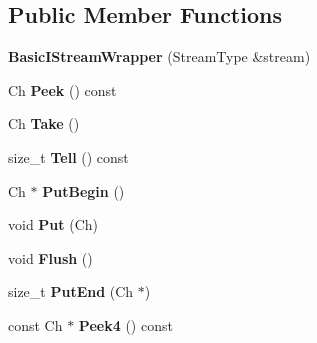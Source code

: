 \subsection*{Public Member Functions}
\begin{DoxyCompactItemize}
\item 
{\bfseries Basic\+I\+Stream\+Wrapper} (Stream\+Type \&stream)\hypertarget{class_basic_i_stream_wrapper_a3e9a2dd2b6b28243f8f2a911f67cdf56}{}\label{class_basic_i_stream_wrapper_a3e9a2dd2b6b28243f8f2a911f67cdf56}

\item 
Ch {\bfseries Peek} () const \hypertarget{class_basic_i_stream_wrapper_ae0c3f22e0955034c3dc90c2398ff4742}{}\label{class_basic_i_stream_wrapper_ae0c3f22e0955034c3dc90c2398ff4742}

\item 
Ch {\bfseries Take} ()\hypertarget{class_basic_i_stream_wrapper_afb71f0329d0abbbc9b22ebeb5c1464d1}{}\label{class_basic_i_stream_wrapper_afb71f0329d0abbbc9b22ebeb5c1464d1}

\item 
size\+\_\+t {\bfseries Tell} () const \hypertarget{class_basic_i_stream_wrapper_a7da87efb1177bfaa131f33c0cb2873fc}{}\label{class_basic_i_stream_wrapper_a7da87efb1177bfaa131f33c0cb2873fc}

\item 
Ch $\ast$ {\bfseries Put\+Begin} ()\hypertarget{class_basic_i_stream_wrapper_a62a3fc10b009ea231fb9d2dc958c539c}{}\label{class_basic_i_stream_wrapper_a62a3fc10b009ea231fb9d2dc958c539c}

\item 
void {\bfseries Put} (Ch)\hypertarget{class_basic_i_stream_wrapper_afa71cb2f5b7668837d0a81e3bce55e69}{}\label{class_basic_i_stream_wrapper_afa71cb2f5b7668837d0a81e3bce55e69}

\item 
void {\bfseries Flush} ()\hypertarget{class_basic_i_stream_wrapper_a37d5e4cd8fdf3c83dad50737e95886a9}{}\label{class_basic_i_stream_wrapper_a37d5e4cd8fdf3c83dad50737e95886a9}

\item 
size\+\_\+t {\bfseries Put\+End} (Ch $\ast$)\hypertarget{class_basic_i_stream_wrapper_ab2ead53490207a1cb0bdd674a03957f3}{}\label{class_basic_i_stream_wrapper_ab2ead53490207a1cb0bdd674a03957f3}

\item 
const Ch $\ast$ {\bfseries Peek4} () const \hypertarget{class_basic_i_stream_wrapper_aaae0c7e7f2d06eb1638cce33ed664f31}{}\label{class_basic_i_stream_wrapper_aaae0c7e7f2d06eb1638cce33ed664f31}


\end{DoxyCompactItemize}
